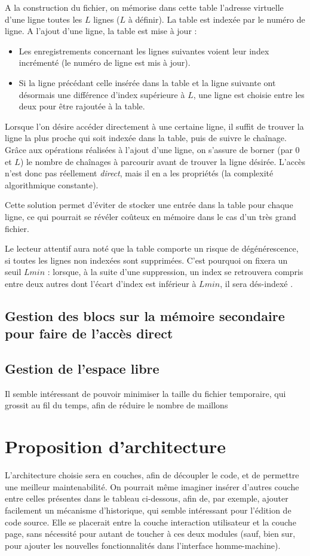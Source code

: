 A la construction du fichier, on mémorise dans cette table l'adresse virtuelle d'une ligne toutes les $L$ lignes ($L$ à définir). La table est indexée par le numéro de ligne.
A l'ajout d'une ligne, la table est mise à jour :
\begin{itemize}
	\item Les enregistrements concernant les lignes suivantes voient leur index incrémenté (le numéro de ligne est mis à jour).
	\item Si la ligne précédant celle insérée dans la table et la ligne suivante ont désormais une différence d'index supérieure à $L$, une ligne est choisie entre les deux pour être rajoutée à la table.
\end{itemize}

Lorsque l'on désire accéder directement à une certaine ligne, il suffit de trouver la ligne la plus proche qui soit indexée dans la table, puis de suivre le chaînage. Grâce aux opérations réalisées à l'ajout d'une ligne, on s'assure de borner (par $0$ et $L$) le nombre de chaînages à parcourir avant de trouver la ligne désirée. L'accès n'est donc pas réellement \emph{direct}, mais il en a les propriétés (la complexité algorithmique constante).

Cette solution permet d'éviter de stocker une entrée dans la table pour chaque ligne, ce qui pourrait se révéler coûteux en mémoire dans le cas d'un très grand fichier. 

Le lecteur attentif aura noté que la table comporte un risque de dégénérescence, si toutes les lignes non indexées sont supprimées. C'est pourquoi on fixera un seuil $Lmin$ : lorsque, à la suite d'une suppression, un index se retrouvera compris entre deux autres dont l'écart d'index est inférieur à $Lmin$, il sera \og dés-indexé \fg. 


\subsection{Gestion des blocs sur la mémoire secondaire pour faire de l'accès
    direct}

\subsection{Gestion de l'espace libre}
Il semble intéressant de pouvoir minimiser la taille du fichier temporaire, qui
grossit au fil du temps, afin de réduire le nombre de maillons

\section{Proposition d'architecture}
L'architecture choisie sera en couches, afin de découpler le code, et de
permettre une meilleur maintenabilité. On pourrait même imaginer insérer
d'autres couche entre celles présentes dans le tableau ci-dessous, afin de, par
exemple, ajouter facilement un mécanisme d'historique, qui semble intéressant
pour l'édition de code source. Elle se placerait entre la couche interaction
utilisateur et la couche page, sans nécessité pour autant de toucher à ces deux
modules (sauf, bien sur, pour ajouter les nouvelles fonctionnalités dans
l'interface homme-machine).

